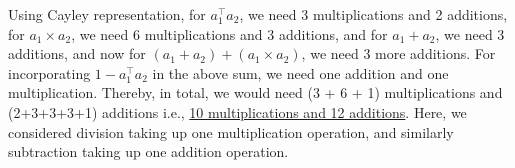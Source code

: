 Using Cayley representation, for \( a_1^\top a_2 \), we need 3 multiplications and 2 additions, for \( a_1 \times a_2 \), we need 6 multiplications and 3 additions, and for \( a_1 + a_2 \), we need 3 additions, and now for \( (a_1 + a_2) + (a_1 \times a_2) \), we need 3 more additions.
For incorporating \( 1 - a_1^\top a_2 \) in the above sum, we need one addition and one multiplication.
Thereby, in total, we would need
(3 + 6 + 1) multiplications and (2+3+3+3+1) additions i.e., \underline{10 multiplications and 12 additions}.
Here, we considered division taking up one multiplication operation, and similarly subtraction taking up one addition operation.
